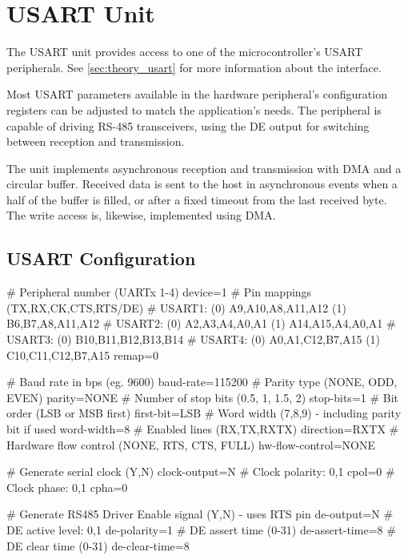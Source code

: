 \section{USART Unit}

The \gls{USART} unit provides access to one of the microcontroller's \gls{USART} peripherals. See \cref{sec:theory_usart} for more information about the interface.

Most \gls{USART} parameters available in the hardware peripheral's configuration registers can be adjusted to match the application's needs. The peripheral is capable of driving RS-485 transceivers, using the \gls{DE} output for switching between reception and transmission.

The unit implements asynchronous reception and transmission with \gls{DMA} and a circular buffer. Received data is sent to the host in asynchronous events when a half of the buffer is filled, or after a fixed timeout from the last received byte. The write access is, likewise, implemented using \gls{DMA}.


\subsection{USART Configuration}

\begin{inicode}
# Peripheral number (UARTx 1-4)
device=1
# Pin mappings (TX,RX,CK,CTS,RTS/DE)
#  USART1: (0) A9,A10,A8,A11,A12   (1) B6,B7,A8,A11,A12
#  USART2: (0) A2,A3,A4,A0,A1      (1) A14,A15,A4,A0,A1
#  USART3: (0) B10,B11,B12,B13,B14
#  USART4: (0) A0,A1,C12,B7,A15    (1) C10,C11,C12,B7,A15
remap=0

# Baud rate in bps (eg. 9600)
baud-rate=115200
# Parity type (NONE, ODD, EVEN)
parity=NONE
# Number of stop bits (0.5, 1, 1.5, 2)
stop-bits=1
# Bit order (LSB or MSB first)
first-bit=LSB
# Word width (7,8,9) - including parity bit if used
word-width=8
# Enabled lines (RX,TX,RXTX)
direction=RXTX
# Hardware flow control (NONE, RTS, CTS, FULL)
hw-flow-control=NONE

# Generate serial clock (Y,N)
clock-output=N
# Clock polarity: 0,1
cpol=0
# Clock phase: 0,1
cpha=0

# Generate RS485 Driver Enable signal (Y,N) - uses RTS pin
de-output=N
# DE active level: 0,1
de-polarity=1
# DE assert time (0-31)
de-assert-time=8
# DE clear time (0-31)
de-clear-time=8
\end{inicode}


